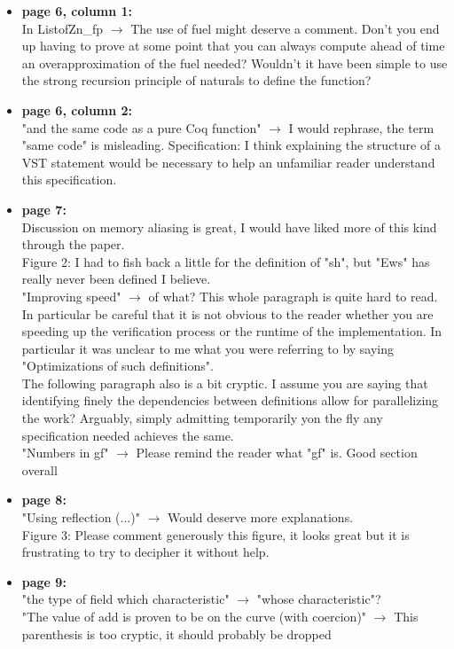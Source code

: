\begin{itemize}
    \item \textbf{page 6, column 1:}\\
          In ListofZn\_fp $\rightarrow$ The use of fuel might deserve a comment. Don't you end up having to prove at some point that you can always compute ahead of time an overapproximation of the fuel needed? Wouldn't it have been simple to use the strong recursion principle of naturals to define the function?

    \item \textbf{page 6, column 2:}\\
          "and the same code as a pure Coq function" $\rightarrow$ I would rephrase, the term "same code" is misleading.
          Specification: I think explaining the structure of a VST statement would be necessary to help an unfamiliar reader understand this specification.

    \item \textbf{page 7:}\\
          Discussion on memory aliasing is great, I would have liked more of this kind through the paper.\\
          Figure 2: I had to fish back a little for the definition of "sh", but "Ews" has really never been defined I believe.\\
          "Improving speed" $\rightarrow$ of what? This whole paragraph is quite hard to read. In particular be careful that it is not obvious to the reader whether you are speeding up the verification process or the runtime of the implementation. In particular it was unclear to me what you were referring to by saying "Optimizations of such definitions".\\
          The following paragraph also is a bit cryptic. I assume you are saying that identifying finely the dependencies between definitions allow for parallelizing the work? Arguably, simply admitting temporarily yon the fly any specification needed  achieves the same.\\
          "Numbers in gf" $\rightarrow$ Please remind the reader what "gf" is. Good section overall

    \item \textbf{page 8:}\\
          "Using reflection (...)" $\rightarrow$ Would deserve more explanations.\\
          Figure 3: Please comment generously this figure, it looks great but it is frustrating to try to decipher it without help.

    \item \textbf{page 9:}\\
          "the type of field which characteristic" $\rightarrow$ "whose characteristic"?\\
          "The value of add is proven to be on the curve (with coercion)" $\rightarrow$ This parenthesis is too cryptic, it should probably be dropped


\end{itemize}
